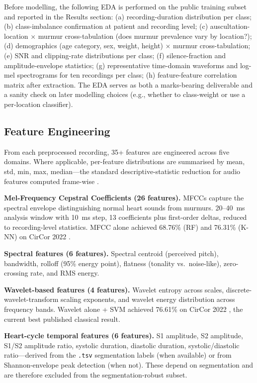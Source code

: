 \documentclass[10pt,twocolumn]{article}
\begin{document}
Before modelling, the following EDA is performed on the public training subset and reported in the Results section: (a) recording-duration distribution per class; (b) class-imbalance confirmation at patient and recording level; (c) auscultation-location × murmur cross-tabulation (does murmur prevalence vary by location?); (d) demographics (age category, sex, weight, height) × murmur cross-tabulation; (e) SNR and clipping-rate distributions per class; (f) silence-fraction and amplitude-envelope statistics; (g) representative time-domain waveforms and log-mel spectrograms for ten recordings per class; (h) feature-feature correlation matrix after extraction. The EDA serves as both a marks-bearing deliverable and a sanity check on later modelling choices (e.g., whether to class-weight or use a per-location classifier).

\subsection{Feature Engineering}

From each preprocessed recording, 35+ features are engineered across five domains. Where applicable, per-feature distributions are summarised by mean, std, min, max, median---the standard descriptive-statistic reduction for audio features computed frame-wise \citep{librosa2015}.

\textbf{Mel-Frequency Cepstral Coefficients (26 features).} MFCCs capture the spectral envelope distinguishing normal heart sounds from murmurs. 20--40~ms analysis window with 10~ms step, 13 coefficients plus first-order deltas, reduced to recording-level statistics. MFCC alone achieved 68.76\% (RF) and 76.31\% (K-NN) on CirCor 2022 \citep{fuadah2023}.

\textbf{Spectral features (6 features).} Spectral centroid (perceived pitch), bandwidth, rolloff (95\% energy point), flatness (tonality vs.\ noise-like), zero-crossing rate, and RMS energy.

\textbf{Wavelet-based features (4 features).} Wavelet entropy across scales, discrete-wavelet-transform scaling exponents, and wavelet energy distribution across frequency bands. Wavelet alone + SVM achieved 76.61\% on CirCor 2022 \citep{wavelet2025}, the current best published classical result.

\textbf{Heart-cycle temporal features (6 features).} S1 amplitude, S2 amplitude, S1/S2 amplitude ratio, systolic duration, diastolic duration, systolic/diastolic ratio---derived from the \texttt{.tsv} segmentation labels (when available) or from Shannon-envelope peak detection (when not). These depend on segmentation and are therefore excluded from the segmentation-robust subset.
\end{document}

